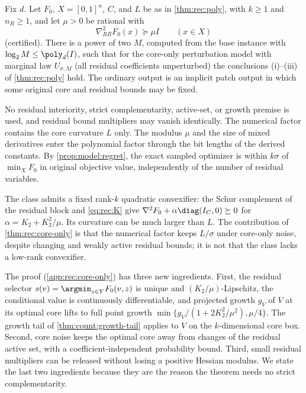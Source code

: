 \begin{theorem}\label{thm:rec:core-only}
Fix $d$. Let $F_0$, $X=[0,1]^n$, $C$, and $L$ be as in \cref{thm:rec:poly},
with $k\ge1$ and $n_R\ge1$, and let $\mu>0$ be rational with
\begin{equation}\label{eq:rec:mu}
 \nabla^2_{RR}F_0(x)\succeq\mu I\qquad(x\in X)
\end{equation}
(certified). There is a power of two $M$, computed from the base instance
with $\log_2M\le\poly_d(I)$, such that for the core-only perturbation model
with marginal law $U_{\sigma,M}$ (all residual coefficients unperturbed) the
conclusions (i)--(iii) of \cref{thm:rec:poly} hold. The ordinary output is
an implicit patch output in which some original core and residual bounds may
be fixed.
\end{theorem}

No residual interiority, strict complementarity, active-set, or growth
premise is used, and residual bound multipliers may vanish identically. The
numerical factor contains the core curvature $L$ only. The modulus $\mu$ and
the size of mixed derivatives enter the polynomial factor through the bit
lengths of the derived constants. By \cref{prop:model:regret}, the exact
sampled optimizer is within $k\sigma$ of $\min_XF_0$ in original objective
value, independently of the number of residual variables.

The class admits a fixed rank-$k$ quadratic convexifier: the Schur complement
of the residual block and \eqref{eq:rec:K} give
$\nabla^2F_0+\alpha\diag(I_C,0)\succeq0$ for $\alpha=K_2+K_2^2/\mu$. Its
curvature can be much larger than $L$. The contribution of
\cref{thm:rec:core-only} is that the numerical factor keeps $L/\sigma$ under
core-only noise, despite changing and weakly active residual bounds; it is
not that the class lacks a low-rank convexifier.

The proof (\cref{app:rec:core-only}) has three new ingredients. First,
the residual selector $s(v)=\argmin_{z\in Y}F_0(v,z)$ is unique and
$(K_2/\mu)$-Lipschitz, the conditional value is continuously differentiable,
and projected growth $g_V$ of $V$ at its optimal core lifts to full point
growth $\min\{g_V/(1+2K_2^2/\mu^2),\mu/4\}$. The growth tail of
\cref{thm:count:growth-tail} applies to $V$ on the $k$-dimensional core box.
Second, core noise keeps the optimal core away from changes of the residual
active set, with a coefficient-independent probability bound. Third, small
residual multipliers can be released without losing a positive Hessian
modulus. We state the last two ingredients because they are the reason the
theorem needs no strict complementarity.

